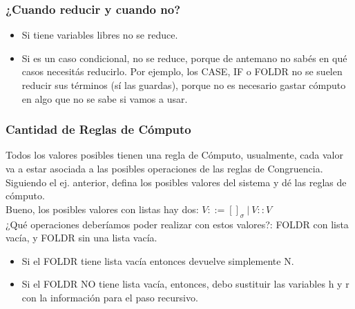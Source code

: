 \documentclass[10pt,a4paper]{article}
\begin{document}
\subsubsection*{¿Cuando reducir y cuando no?}
\begin{itemize}
    \item Si tiene variables libres no se reduce. 
    \item Si es un caso condicional, no se reduce, porque de antemano no sabés en qué casos necesitás reducirlo. Por ejemplo, los CASE, IF o FOLDR no se suelen reducir sus términos (sí las guardas), porque no es necesario gastar cómputo en algo que no se sabe si vamos a usar.
\end{itemize}
\subsubsection*{Cantidad de Reglas de Cómputo}
Todos los valores posibles tienen una regla de Cómputo, usualmente, cada valor va a estar asociada a las posibles operaciones de las reglas de Congruencia. \\
Siguiendo el ej. anterior, defina los posibles valores del sistema y dé las reglas de cómputo. \\
Bueno, los posibles valores con listas hay dos: $V::=[]_{\sigma} \ | \ V::V$ \\
¿Qué operaciones deberíamos poder realizar con estos valores?: FOLDR con lista vacía, y FOLDR sin una lista vacía. 
\begin{itemize}
    \item Si el FOLDR tiene lista vacía entonces devuelve simplemente N.
    \item Si el FOLDR NO tiene lista vacía, entonces, debo sustituir las variables h y r con la información para el paso recursivo.
\end{itemize}
\end{document}
